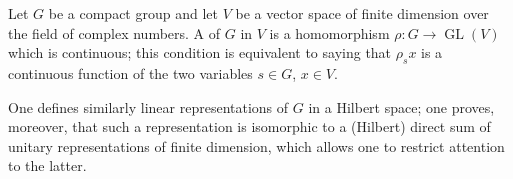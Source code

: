 Let $G$ be a compact group and let $V$ be a vector space of finite dimension over the field of complex numbers. A  of $G$ in $V$ is a homomorphism $\rho: G \to \operatorname{GL}(V)$ which is continuous; this condition is equivalent to saying that $\rho_s x$ is a continuous function of the two variables $s \in G$, $x \in V$.

One defines similarly linear representations of $G$ in a Hilbert space; one proves, moreover, that such a representation is isomorphic to a (Hilbert) direct sum of unitary representations of finite dimension, which allows one to restrict attention to the latter.
